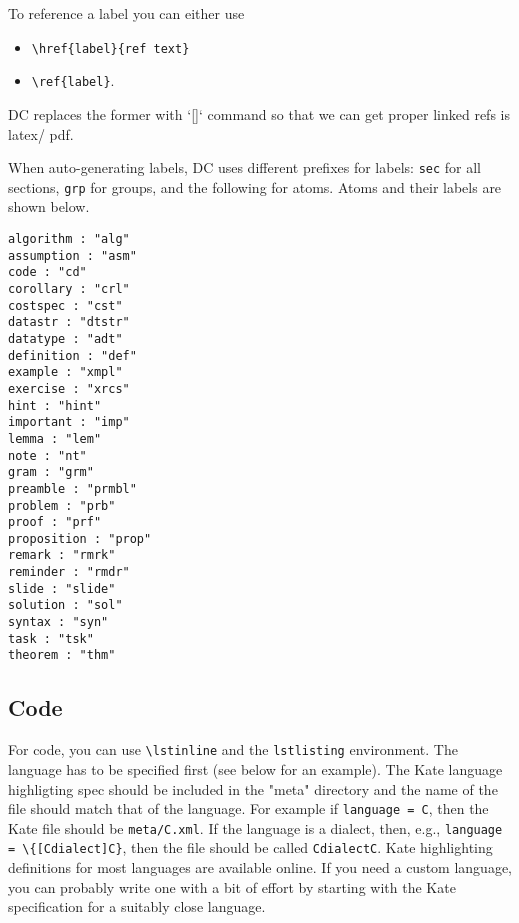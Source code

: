 \begin{gram}[References]
To reference a label you can either use
\begin{itemize}
\item \lstinline`\href{label}{ref text}`
\item \lstinline`\ref{label}`.
\end{itemize}
%
DC replaces the former with `\hyperref[][]` command so that we can get proper linked refs is latex/ pdf.
\end{gram}


When auto-generating labels, DC uses different prefixes for labels: \lstinline`sec` for all sections, \lstinline`grp` for groups, and the following for atoms.   Atoms and their labels are shown below.
%
\begin{lstlisting}
algorithm : "alg"
assumption : "asm"
code : "cd"
corollary : "crl"
costspec : "cst"
datastr : "dtstr"
datatype : "adt"
definition : "def"
example : "xmpl"
exercise : "xrcs"
hint : "hint"
important : "imp"
lemma : "lem"
note : "nt"
gram : "grm"
preamble : "prmbl"
problem : "prb"
proof : "prf"
proposition : "prop"
remark : "rmrk"
reminder : "rmdr"
slide : "slide"
solution : "sol"
syntax : "syn"
task : "tsk"
theorem : "thm"
\end{lstlisting}

\subsection{Code}
\label{sec:mtl::code}
For code, you can use \lstinline`\lstinline` and the \lstinline`lstlisting` environment.  The language has to be specified first (see below for an example).  The Kate language highligting spec should be included in the "meta" directory and the name of the file should match that of the language.  For example if \lstinline`language = C`, then the Kate file should be \lstinline`meta/C.xml`.  If the language is a dialect, then, e.g., \lstinline`language = \{[Cdialect]C}`, then the file should be called \lstinline`CdialectC`.  
%
Kate highlighting definitions for most languages are available online.
%
If you need a custom language, you can probably write one with a bit of effort by starting with the Kate specification for a  suitably close language.

